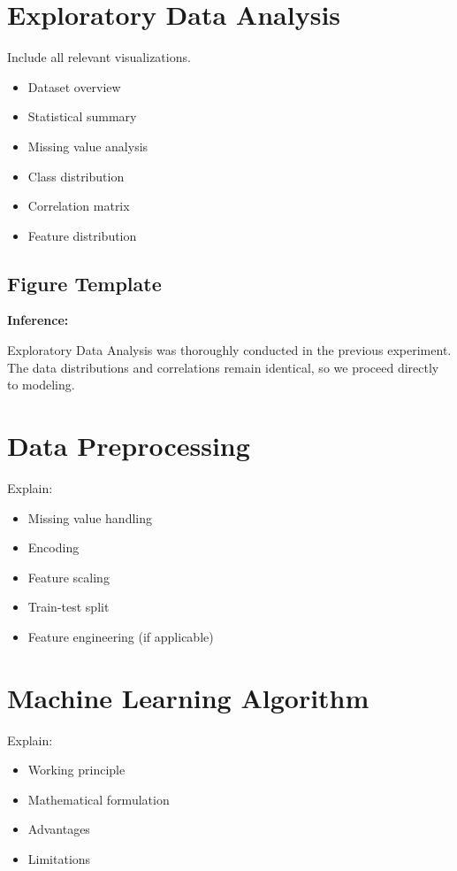 \documentclass[12pt,a4paper]{article}
\begin{document}
\section{Exploratory Data Analysis}
Include all relevant visualizations.
\begin{itemize}
\item Dataset overview
\item Statistical summary
\item Missing value analysis
\item Class distribution
\item Correlation matrix
\item Feature distribution
\end{itemize}

\subsection*{Figure Template}



\textbf{Inference:}

Exploratory Data Analysis was thoroughly conducted in the previous experiment. The data distributions and correlations remain identical, so we proceed directly to modeling.

\section{Data Preprocessing}

Explain:
\begin{itemize}
\item Missing value handling
\item Encoding
\item Feature scaling
\item Train-test split
\item Feature engineering (if applicable)
\end{itemize}

\section{Machine Learning Algorithm}
Explain:
\begin{itemize}
\item Working principle
\item Mathematical formulation
\item Advantages
\item Limitations
\end{itemize}
\end{document}
